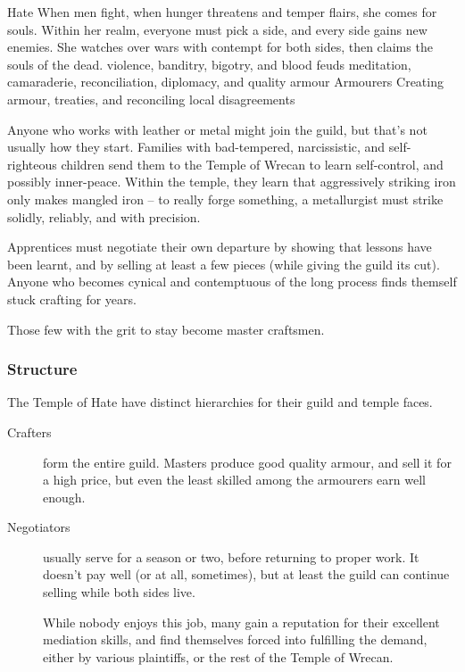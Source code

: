 \begin{multicols}{2}

  {\textxswup}%
  {Hate}%
  {When men fight, when hunger threatens and temper flairs, she comes for souls.
  Within her realm, everyone must pick a side, and every side gains new enemies.
  She watches over wars with contempt for both sides, then claims the souls of the dead.}%
  {violence, banditry, bigotry, and blood feuds}%
  {meditation, camaraderie, reconciliation, diplomacy, and quality armour}%
  {Armourers}%
  {Creating armour, treaties, and reconciling local disagreements}%

Anyone who works with leather or metal might join the guild, but that's not usually how they start.
Families with bad-tempered, narcissistic, and self-righteous children send them to the Temple of Wrecan to learn self-control, and possibly inner-peace.
Within the temple, they learn that aggressively striking iron only makes mangled iron -- to really forge something, a metallurgist must strike solidly, reliably, and with precision.

Apprentices must negotiate their own departure by showing that lessons have been learnt, and by selling at least a few pieces (while giving the guild its cut).
Anyone who becomes cynical and contemptuous of the long process finds themself stuck crafting for years.

Those few with the grit to stay become master craftsmen.

\subsubsection{Structure}
The Temple of Hate have distinct hierarchies for their guild and temple faces.

\begin{description}
  \item[Crafters]
  form the entire guild.
  Masters produce good quality armour, and sell it for a high price, but even the least skilled among the armourers earn well enough.
  \item[Negotiators]
  usually serve for a season or two, before returning to proper work.
  It doesn't pay well (or at all, sometimes), but at least the guild can continue selling while both sides live.

  While nobody enjoys this job, many gain a reputation for their excellent mediation skills, and find themselves forced into fulfilling the demand, either by various plaintiffs, or the rest of the Temple of Wrecan.
\end{description}


\end{multicols}
